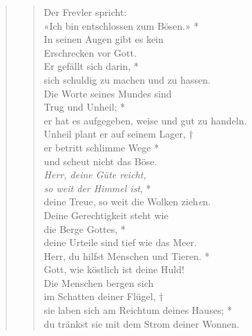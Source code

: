 \medskip

\def\greinitialformat#1{{\fontsize{40}{40}\selectfont #1}}
\gresetfirstlineaboveinitial{\small \textcolor{red}{Ps 36}}{}
\setaboveinitialseparation{0.72mm}



\medskip
\smallskip



\begin{quote}
\begin{verse}
Der Frevler spricht:\\
«Ich bin entschlossen zum Bösen.» *\\
In seinen Augen gibt es kein\\
Erschrecken vor Gott.\\ 
\vin Er gefällt sich darin, *\\ 
\vin sich schuldig zu machen und zu hassen.\\
Die Worte seines Mundes sind\\
Trug und Unheil; *\\
er hat es aufgegeben, weise und gut zu handeln.\\ 
\vin Unheil plant er auf seinem Lager, †\\ 
\vin er betritt schlimme Wege *\\ 
\vin und scheut nicht das Böse.\\ 
\textit{Herr, deine Güte reicht,\\
so weit der Himmel ist}, *\\
deine Treue, so weit die Wolken zieh\textit{e}n.\\ 
\vin Deine Gerechtigkeit steht wie\\ 
\vin die Berge Gottes, *\\ 
\vin deine Urteile sind tief wie das Meer.\\
Herr, du hilfst Menschen und Tieren. *\\
Gott, wie köstlich ist deine Huld! \\ 
\vin Die Menschen bergen sich\\ 
\vin im Schatten deiner Flügel, †\\ 
\vin sie laben sich am Reichtum deines Hauses; *\\ 
\vin du tränkst sie mit dem Strom deiner Wonnen.\\ 

\end{verse}
\end{quote}
